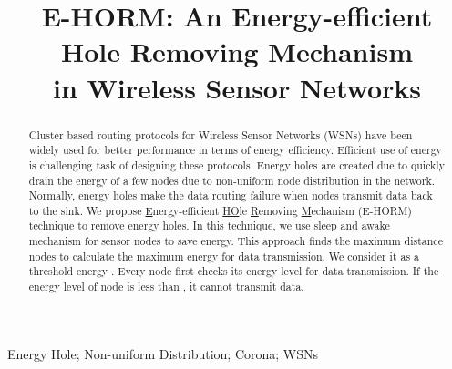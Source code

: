 \documentclass{article}
\title{E-HORM: An Energy-efficient Hole Removing Mechanism\\ in Wireless Sensor Networks}
\begin{document}
\maketitle
\begin{abstract}
Cluster based routing protocols for Wireless Sensor Networks (WSNs) have been widely used for better performance in terms of energy efficiency.
Efficient use of energy is challenging task of designing these protocols. Energy holes are created due to quickly drain the energy of a few nodes due to non-uniform node distribution in the network. Normally, energy holes make the data routing failure when nodes transmit data back to the sink. We propose \underline{E}nergy-efficient \underline{HO}le \underline{R}emoving \underline{M}echanism (E-HORM) technique to remove energy holes. In this technique, we use sleep and awake mechanism for sensor nodes to save energy. This approach finds the maximum distance nodes to calculate the maximum energy for data transmission. We consider it as a threshold energy . Every node first checks its energy level for data transmission. If the energy level of node is less than , it cannot transmit data. 
\end{abstract}
\begin{keywords}
Energy Hole; Non-uniform Distribution; Corona; WSNs
\end{keywords}
\end{document}
